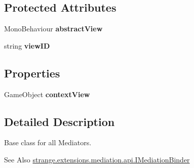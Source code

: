 \subsection*{Protected Attributes}
\begin{DoxyCompactItemize}
\item 
\hypertarget{classstrange_1_1extensions_1_1mediation_1_1impl_1_1_mediator_a73f6f51974cc84ff4cddc9890592e035}{Mono\-Behaviour {\bfseries abstract\-View}}\label{classstrange_1_1extensions_1_1mediation_1_1impl_1_1_mediator_a73f6f51974cc84ff4cddc9890592e035}

\item 
\hypertarget{classstrange_1_1extensions_1_1mediation_1_1impl_1_1_mediator_ab2be755d94213de014077fbcf3cd10a1}{string {\bfseries view\-I\-D}}\label{classstrange_1_1extensions_1_1mediation_1_1impl_1_1_mediator_ab2be755d94213de014077fbcf3cd10a1}

\end{DoxyCompactItemize}
\subsection*{Properties}
\begin{DoxyCompactItemize}
\item 
\hypertarget{classstrange_1_1extensions_1_1mediation_1_1impl_1_1_mediator_a7a2db38ad551c3a63083f169e998ee12}{Game\-Object {\bfseries context\-View}}\label{classstrange_1_1extensions_1_1mediation_1_1impl_1_1_mediator_a7a2db38ad551c3a63083f169e998ee12}

\end{DoxyCompactItemize}


\subsection{Detailed Description}
Base class for all Mediators. 

\begin{DoxySeeAlso}{See Also}
\hyperlink{interfacestrange_1_1extensions_1_1mediation_1_1api_1_1_i_mediation_binder}{strange.\-extensions.\-mediation.\-api.\-I\-Mediation\-Binder} 
\end{DoxySeeAlso}



